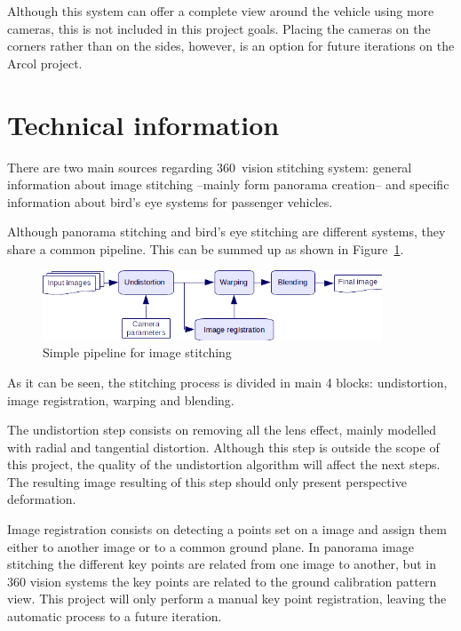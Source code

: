 Although this system can offer a complete view around the vehicle using more cameras, this is not included in this project goals. Placing the cameras on the corners rather than on the sides, however, is an option for future iterations on the Arcol project.

\section{Technical information}
There are two main sources regarding 360\degree~vision stitching system: general information about image stitching --mainly form panorama creation-- and specific information about bird's eye systems for passenger vehicles.

Although panorama stitching and bird's eye stitching are different systems, they share a common pipeline. This can be summed up as shown in Figure~\ref{fig:simple-pipeline}. \cite{opencvpipeline}

\begin{figure}[h]
\center
\includegraphics[width=0.9\textwidth]{images/simple-pipeline}
		\caption{Simple pipeline for image stitching}
		\label{fig:simple-pipeline}
\end{figure}

As it can be seen, the stitching process is divided in main 4 blocks: undistortion, image registration, warping and blending. 

The undistortion step consists on removing all the lens effect, mainly modelled with radial and tangential distortion. Although this step is outside the scope of this project, the quality of the undistortion algorithm will affect the next steps. The resulting image resulting of this step should only present perspective deformation.

Image registration consists on detecting a points set on a image and assign them either to another image or to a common ground plane. In panorama image stitching the different key points are related from one image to another, but in 360\degree{} vision systems the key points are related to the ground calibration pattern view. This project will only perform a manual key point registration, leaving the automatic process to a future iteration.

